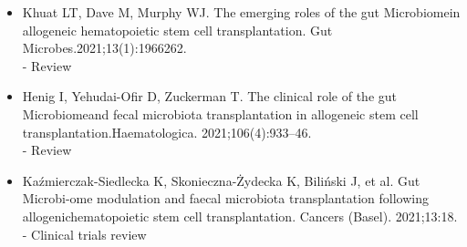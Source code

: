 \documentclass[11pt,a4paper]{article}
\begin{document}
\begin{itemize}
    - Clinical
     \item  Khuat LT, Dave M, Murphy WJ. The emerging roles of the gut Microbiomein allogeneic hematopoietic stem cell transplantation. Gut Microbes.2021;13(1):1966262.\\
     - Review
    \item  Henig I, Yehudai-Ofir D, Zuckerman T. The clinical role of the gut Microbiomeand fecal microbiota transplantation in allogeneic stem cell transplantation.Haematologica. 2021;106(4):933–46.\\
    - Review
    \item  Kaźmierczak-Siedlecka K, Skonieczna-Żydecka K, Biliński J, et al. Gut Microbi-ome modulation and faecal microbiota transplantation following allogenichematopoietic stem cell transplantation. Cancers (Basel). 2021;13:18.\\
    - Clinical trials review
\end{itemize}
\end{document}
